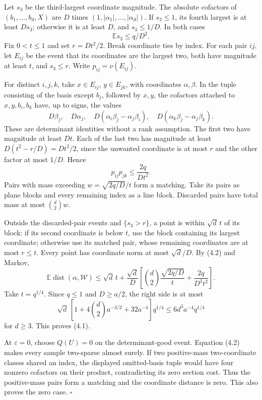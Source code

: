 \documentclass[
  11pt,
]{article}
\begin{document}
Let \(s_3\) be the third-largest coordinate magnitude. The absolute
cofactors of \((b_1,\ldots,b_d,X)\) are \(D\) times
\((1,|\alpha_1|,\ldots,|\alpha_d|)\). If \(s_3\le1\), its fourth largest
is at least \(Ds_3\); otherwise it is at least \(D\), and \(s_3\le1/D\).
In both cases \[
 \mathbb E s_3\le q/D^2.                                      \tag{4.2}
\] Fix \(0<t\le1\) and set \(r=Dt^2/2\). Break coordinate ties by index.
For each pair \(ij\), let \(E_{ij}\) be the event that its coordinates
are the largest two, both have magnitude at least \(t\), and
\(s_3\le r\). Write \(p_{ij}=\nu(E_{ij})\).

For distinct \(i,j,k\), take \(x\in E_{ij}\), \(y\in E_{jk}\), with
coordinates \(\alpha,\beta\). In the tuple consisting of the basis
except \(b_j\), followed by \(x,y\), the cofactors attached to
\(x,y,b_i,b_k\) have, up to signs, the values \[
 D\beta_j,\quad D\alpha_j,\quad
 D(\alpha_i\beta_j-\alpha_j\beta_i),\quad
 D(\alpha_k\beta_j-\alpha_j\beta_k).
\] These are determinant identities without a rank assumption. The first
two have magnitude at least \(Dt\). Each of the last two has magnitude
at least \(D(t^2-r/D)=Dt^2/2\), since the unwanted coordinate is at most
\(r\) and the other factor at most \(1/D\). Hence \[
 p_{ij}p_{jk}\le\frac{2q}{Dt^2}.
\] Pairs with mass exceeding \(w=\sqrt{2q/D}/t\) form a matching. Take
its pairs as plane blocks and every remaining index as a line block.
Discarded pairs have total mass at most \(\binom d2w\).

Outside the discarded-pair events and \(\{s_3>r\}\), a point is within
\(\sqrt d\,t\) of its block: if its second coordinate is below \(t\),
use the block containing its largest coordinate; otherwise use its
matched pair, whose remaining coordinates are at most \(r\le t\). Every
point has coordinate norm at most \(\sqrt d/D\). By (4.2) and Markov, \[
 \mathbb E\operatorname{dist}(\alpha,\mathcal W)
 \le\sqrt d\,t+\frac{\sqrt d}{D}
 \left[\binom d2\frac{\sqrt{2q/D}}t+\frac{2q}{D^3t^2}\right].     \tag{4.3}
\] Take \(t=q^{1/4}\). Since \(q\le1\) and \(D\ge a/2\), the right side
is at most \[
 \sqrt d\,[1+4\binom d2a^{-3/2}+32a^{-4}]q^{1/4}
 \le6d^3a^{-4}q^{1/4}
\] for \(d\ge3\). This proves (4.1).

At \(\varepsilon=0\), choose \(Q(U)=0\) on the determinant-good event.
Equation (4.2) makes every sample two-sparse almost surely. If two
positive-mass two-coordinate classes shared an index, the displayed
omitted-basis tuple would have four nonzero cofactors on their product,
contradicting its zero section cost. Thus the positive-mass pairs form a
matching and the coordinate distance is zero. This also proves the zero
case. \(\square\)
\end{document}
